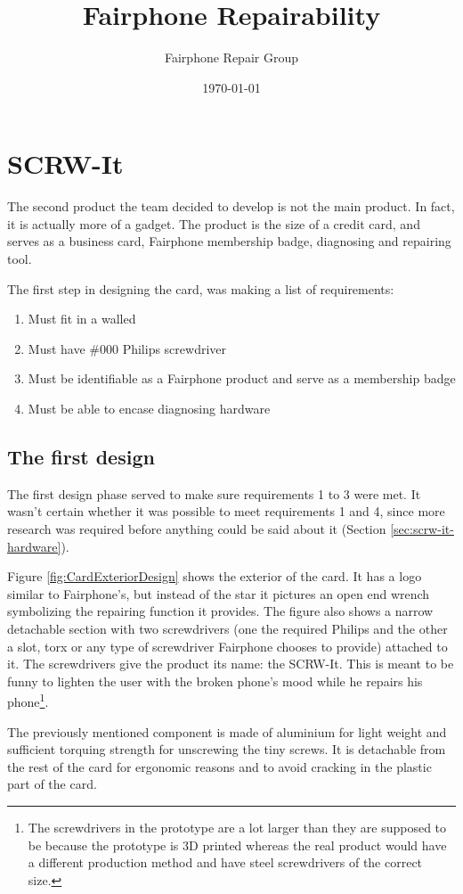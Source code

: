 \documentclass[final,a4paper]{report} %
\author{Fairphone Repair Group}
\title{Fairphone Repairability}
\date{\today}
\begin{document}
	\chapter{SCRW-It}
	\label{ch:scrw-it}
	The second product the team decided to develop is not the main product. In fact, it is actually more of a gadget. The product is the size of a credit card, and serves as a business card, Fairphone membership badge, diagnosing and repairing tool. 
	
	The first step in designing the card, was making a list of requirements:
	\begin{enumerate}
		\item Must fit in a walled
		\item Must have \#000 Philips screwdriver
		\item Must be identifiable as a Fairphone product and serve as a membership badge
		\item Must be able to encase diagnosing hardware
	\end{enumerate}
	
	\section{The first design}
	\label{sec:scrw-it-first-design}
	
	The first design phase served to make sure requirements 1 to 3 were met. It wasn't certain whether it was possible to meet requirements 1 and 4, since more research was required before anything could be said about it (Section \ref{sec:scrw-it-hardware}). 
	
	Figure \ref{fig:CardExteriorDesign} shows the exterior of the card. It has a logo similar to Fairphone's, but instead of the star it pictures an open end wrench symbolizing the repairing function it provides. The figure also shows a narrow detachable section with two screwdrivers (one the required Philips and the other a slot, torx or any type of screwdriver Fairphone chooses to provide) attached to it. The screwdrivers give the product its name: the SCRW-It. This is meant to be funny to lighten the user with the broken phone's mood while he repairs his phone\footnote{The screwdrivers in the prototype are a lot larger than they are supposed to be because the prototype is 3D printed whereas the real product would have a different production method and have steel screwdrivers of the correct size.}. 
	
	The previously mentioned component is made of aluminium for light weight and sufficient torquing strength for unscrewing the tiny screws. It is detachable from the rest of the card for ergonomic reasons and to avoid cracking in the plastic part of the card.
	
\end{document}

